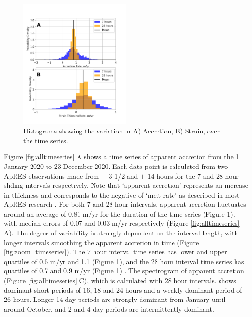 \newpage




\begin{figure}[!ht]
\centering
\includegraphics[width=0.5\textwidth]{chapters/3/histogram.png}
\caption[]{Histograms showing the variation in A) Accretion, B) Strain, over the time series. 
}
\label{fig:histogram}
\end{figure}

Figure \ref{fig:alltimeseries} A shows a time series of apparent accretion from the 1  January 2020 to 23 December 2020.  Each data point is calculated from two ApRES observations made from $\pm$ 3 1/2 and $\pm$ 14 hours for the 7 and 28 hour sliding intervals respectively. Note that `apparent accretion' represents an increase in thickness and corresponds to the negative of `melt rate' as described in most ApRES research \cite[e.g.][]{vavnkova2021nature,lindback2019spatial}.
For both 7 and 28 hour intervals, apparent accretion fluctuates around an average of 0.81 m/yr  for the duration of the time series (Figure \ref{fig:histogram}), with median errors  of 0.07 and 0.03 m/yr respectively (Figure \ref{fig:alltimeseries} A).  The degree of variability is strongly dependent on the interval length, with longer intervals smoothing the apparent accretion in time (Figure \ref{fig:zoom_timeseries}). The 7 hour interval time series has lower and upper quartiles of 0.5 m/yr and  1.1 (Figure \ref{fig:histogram}), and the 28 hour interval time series has quartiles of 0.7 and 0.9 m/yr (Figure \ref{fig:histogram}) . The spectrogram of apparent accretion (Figure \ref{fig:alltimeseries} C), which is calculated with 28 hour intervals, shows dominant short periods of 16, 18 and 24 hours and a weakly dominant period of 26 hours. Longer 14 day periods are strongly dominant from January until around October, and 2 and 4 day periods are intermittently dominant. 

